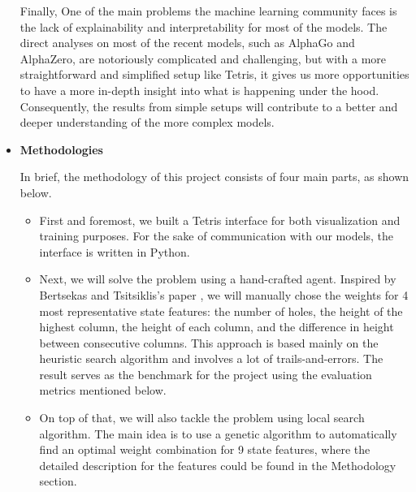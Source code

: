 \documentclass[letterpaper]{article} %
\begin{document}
\begin{itemize}
Finally,  One of the main problems the machine learning community faces is the lack of explainability and interpretability for most of the models. The direct analyses on most of the recent models, such as AlphaGo and AlphaZero, are notoriously complicated and challenging, but with a more straightforward and simplified setup like Tetris, it gives us more opportunities to have a more in-depth insight into what is happening under the hood. Consequently, the results from simple setups will contribute to a better and deeper understanding of the more complex models.

\item 
{\bf Methodologies}

In brief, the methodology of this project consists of four main parts, as shown below.
\begin{itemize}
  \item 
  First and foremost, we built a Tetris interface for both visualization and training purposes. For the sake of communication with our models, the interface is written in Python. 
  \item 
  Next, we {will solve} the problem using a hand-crafted agent. {Inspired by Bertsekas and Tsitsiklis's paper} \cite{Bertsekas_1996}, we will manually chose the weights for 4 most representative state features: the number of holes, the height of the highest column, the height of each column, and the difference in height between consecutive columns. This approach is based mainly on the heuristic search algorithm and involves a lot of trails-and-errors. The result serves as the benchmark for the project {using the evaluation metrics mentioned below}.
  \item 
  On top of that, we will also tackle the problem {using local search algorithm}. The main idea is to use a genetic algorithm to automatically find an optimal weight combination for 9 state features, where the detailed description for the features could be found in the Methodology section. 
  

\end{itemize}
\end{itemize}
\end{document}
